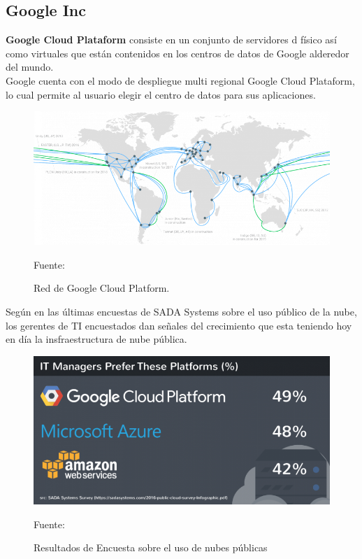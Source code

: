 \documentclass[a4paper, 12pt]{report}
\begin{document}
\subsection{Google Inc}
\begin{justify}
{\bf Google Cloud Plataform} consiste en un conjunto de servidores d f\'isico as\'i como virtuales que est\'an contenidos en los centros de datos de Google alderedor del mundo.
\\ Google cuenta con el modo de despliegue  multi regional Google Cloud Plataform, lo cual permite al usuario elegir el centro de datos para sus aplicaciones.
\end{justify}
\begin{figure}[ht]
\begin{center}
\includegraphics[scale=0.6]{google_cloud}
\end{center}
\begin{center}
\vskip -0.5cm
\caption{\small{Red de Google Cloud Platform.}}
{\small{Fuente: \cite{google_cloud}}}
\end{center}
\end{figure}
\begin{justify}
Según \cite{google_cloud} en las \'ultimas encuestas de SADA Systems sobre el uso p\'ublico de la nube, los  gerentes de TI encuestados dan se\~{n}ales del crecimiento que esta teniendo hoy en día la insfraestructura de nube p\'ublica.
\end{justify}
\begin{figure}[H]
\begin{center}
\includegraphics[scale=0.4]{encuesta}
\end{center}
\begin{center}
\vskip -0.5cm
\caption{\small{Resultados de Encuesta sobre el uso de nubes p\'ublicas}}
{\small{Fuente: \cite{google_cloud}}}
\end{center}
\end{figure}
\end{document}

